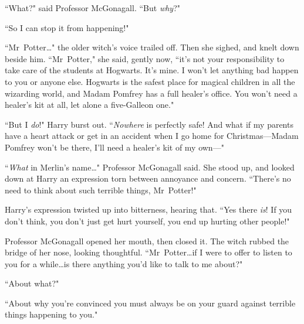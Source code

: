 ``What?" said Professor McGonagall. ``But \emph{why}?"

``So I can stop it from happening!"

``Mr~Potter…" the older witch's voice trailed off. Then she sighed, and knelt down beside him. ``Mr~Potter," she said, gently now, ``it's not your responsibility to take care of the students at Hogwarts. It's mine. I won't let anything bad happen to you or anyone else. Hogwarts is the safest place for magical children in all the wizarding world, and Madam Pomfrey has a full healer's office. You won't need a healer's kit at all, let alone a five-Galleon one."

``But I \emph{do}!" Harry burst out. ``\emph{Nowhere} is perfectly safe! And what if my parents have a heart attack or get in an accident when I go home for Christmas—Madam Pomfrey won't be there, I'll need a healer's kit of my own—"

``\emph{What} in Merlin's name…" Professor McGonagall said. She stood up, and looked down at Harry an expression torn between annoyance and concern. ``There's no need to think about such terrible things, Mr~Potter!"

Harry's expression twisted up into bitterness, hearing that. ``Yes there \emph{is}! If you don't think, you don't just get hurt yourself, you end up hurting other people!"

Professor McGonagall opened her mouth, then closed it. The witch rubbed the bridge of her nose, looking thoughtful. ``Mr~Potter…if I were to offer to listen to you for a while…is there anything you'd like to talk to me about?"

``About what?"

``About why you're convinced you must always be on your guard against terrible things happening to you."

